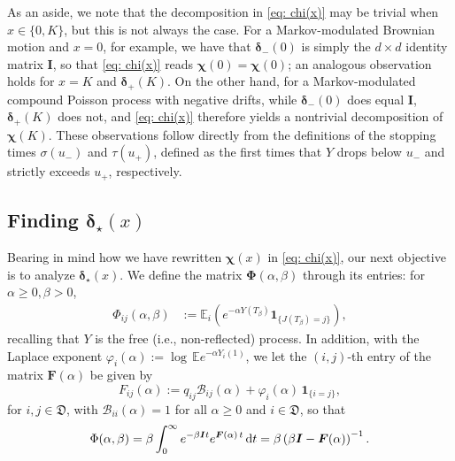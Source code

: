 \documentclass[reqno,12pt]{amsart}
\newcommand{\bs}{\boldsymbol}
\newcommand{\defD}{{\mathfrak D}}
\newcommand{\ind}[1]{{\bs 1}_{\{#1\}}}
\begin{document}
As an aside, we note that the decomposition in \eqref{eq: chi(x)} may be trivial when $x \in \{0,K\}$, but this is not always the case. For a Markov-modulated Brownian motion and $x=0$, for example, we have that ${\bs \delta}_-(0)$ is simply the $d\times d$ identity matrix ${\bs I}$, so that \eqref{eq: chi(x)} reads ${\bs \chi}(0) = {\bs \chi}(0)$;  an analogous observation holds for $x=K$ and ${\bs \delta}_+(K)$. On the other hand, for a Markov-modulated compound Poisson process with negative drifts, while ${\bs \delta}_-(0)$ does equal ${\bs I}$, ${\bs \delta}_+(K)$ does not, and \eqref{eq: chi(x)} therefore yields a nontrivial decomposition of ${\bs \chi}(K)$. These observations follow directly from the definitions of the stopping times $\sigma(u_-)$ and $\tau(u_+)$, defined as the first times that $Y$ drops below $u_-$ and strictly exceeds $u_+$, respectively.

\subsection{Finding \texorpdfstring{${\bs \delta}_{\star}(x)$}{delta star}}\label{sec: delta_star}
Bearing in mind how we have rewritten ${\bs \chi}(x)$ in \eqref{eq: chi(x)}, our next objective is to analyze ${\bs \delta}_{\star}(x)$. 
We define the matrix ${\bs \Phi}(\alpha,\beta)$ through its entries: for $\alpha \geqslant0, \beta>0$,
\begin{align*}\label{eq: Phi_ij}
        \Phi_{ij}(\alpha, \beta) &:= \mathbb{E}_i\left(e^{-\alpha Y(T_{\beta})}{\bs 1}_{\{J(T_{\beta}) = j\}}\right),
\end{align*}
recalling that $Y$ is the free (i.e., non-reflected) process.
In addition, with the Laplace exponent $\varphi_i(\alpha):=\log\,\mathbb{E}e^{-\alpha Y_i(1)}$, we let the $(i,j)$-th entry of the matrix $\bs F(\alpha)$ be given by
\begin{equation}\label{eq: defF}
    F_{ij}(\alpha) := q_{ij}\mathscr{B}_{ij}(\alpha) + \varphi_{i}(\alpha)\,\ind{i=j},
\end{equation}
for $i,j\in\defD $, 
with ${\mathscr B}_{ii}(\alpha)= 1$ for all $\alpha\geqslant 0$ and $i\in\defD $, so that
\[\Phi(\alpha, \beta) = \beta \int_0^\infty e^{-\beta \bs{I} t}e^{\bs F(\alpha)\,t}\,{\rm d}t = \beta \left(\beta \bs{I} - \bs F(\alpha)\right)^{-1}.\]
\end{document}
